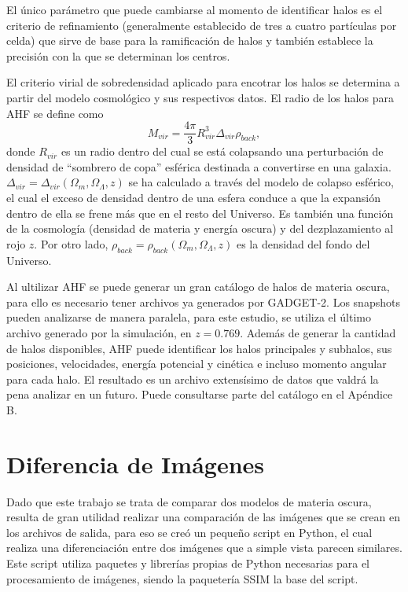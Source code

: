 \documentclass[a4paper,openright,12pt]{book}
\begin{document}
El único parámetro que puede cambiarse al momento de identificar halos es el criterio de refinamiento (generalmente establecido de tres a cuatro partículas por celda) que sirve de base para la ramificación de halos y también establece la precisión con la que se determinan los centros. 

El criterio virial de sobredensidad aplicado para encotrar los halos se determina a partir del modelo cosmológico y sus respectivos datos. El radio de los halos para AHF se define como 
\begin{equation}
M_{vir} = \frac{4 \pi}{3}R_{vir}^{3}\Delta_{vir}\rho_{back},\label{eqn 4.1}
\end{equation}
donde $R_{vir}$ es un radio dentro del cual se está colapsando una perturbación de densidad de ``sombrero de copa'' esférica destinada a convertirse en una galaxia. $\Delta_{vir}=\Delta_{vir}(\Omega_{m},\Omega_{\Lambda},z)$ se ha calculado a través del modelo de colapso esférico, el cual el exceso de densidad dentro de una esfera conduce a que la expansión dentro de ella se frene más que en el resto del Universo. Es también una función de la cosmología (densidad de materia y energía oscura) y del dezplazamiento al rojo $z$. Por otro lado,  $\rho_{back}=\rho_{back}(\Omega_{m},\Omega_{\Lambda},z)$ es la densidad del fondo del Universo.

Al ultilizar AHF se puede generar un gran catálogo de halos de materia oscura, para ello es necesario tener archivos ya generados por GADGET-2. Los \textsf{snapshots} pueden analizarse de manera paralela, para este estudio, se utiliza el último archivo generado por la simulación, en $z = 0.769$. Además de generar la cantidad de halos disponibles, AHF puede identificar los halos principales y subhalos, sus posiciones, velocidades, energía potencial y cinética e incluso momento angular para cada halo. El resultado es un archivo extensísimo de datos que valdrá la pena analizar en un futuro. Puede consultarse parte del catálogo en el Apéndice B.


\section{Diferencia de Imágenes}
Dado que este trabajo se trata de comparar dos modelos de materia oscura, resulta de gran utilidad realizar una comparación de las imágenes que se crean en los archivos de salida, para eso se creó un pequeño script en Python, el cual realiza una diferenciación entre dos imágenes que a simple vista parecen similares. Este script utiliza paquetes y librerías propias de Python necesarias para el procesamiento de imágenes, siendo la paquetería \textsf{SSIM} la base del script.
\end{document}
